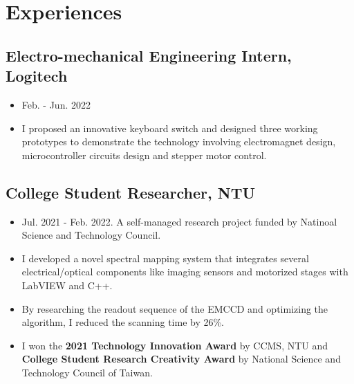 \documentclass[12pt]{article}
\begin{document}
    \section*{Experiences
    }
        \subsection*{Electro-mechanical Engineering Intern, Logitech}
        {\sffamily
        \begin{itemize}
            \item Feb. - Jun. 2022
            \item I proposed an innovative keyboard switch and designed three working prototypes to demonstrate the technology involving electromagnet design, microcontroller circuits design and stepper motor control.
        \end{itemize}
        }
        \subsection*{College Student Researcher, NTU}
        {\sffamily
        \begin{itemize}
            \item Jul. 2021 - Feb. 2022. A self-managed research project funded by Natinoal Science and Technology Council.
            \item I developed a novel spectral mapping system that integrates several electrical/optical components like imaging sensors and motorized stages with LabVIEW and C++. %
            \item By researching the readout sequence of the EMCCD and optimizing the algorithm, I reduced the scanning time by 26\%.
            \item I won the \textbf{2021 Technology Innovation Award} by CCMS, NTU and \textbf{College Student Research Creativity Award} by National Science and Technology Council of Taiwan.
        \end{itemize}}
\end{document}
